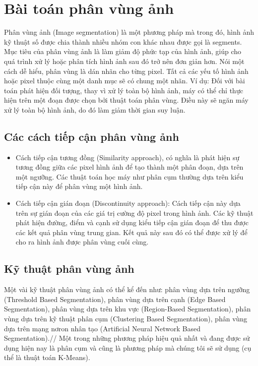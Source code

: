 \documentclass{article}
\begin{document}
    \newpage

    \section{Bài toán phân vùng ảnh}
    \label{sec:img_segmentation}
    Phân vùng ảnh (Image segmentation) là một phương pháp mà trong đó, hình ảnh kỹ thuật số được chia thành nhiều nhóm con khác nhau được gọi là segments. Mục tiêu của phân vùng ảnh là làm giảm độ phức tạp của hình ảnh, giúp cho quá trình xử lý hoặc phân tích hình ảnh sau đó trở nên đơn giản hơn. Nói một cách dễ hiểu, phân vùng là dán nhãn cho từng pixel. Tất cả các yếu tố hình ảnh hoặc pixel thuộc cùng một danh mục sẽ có chung một nhãn. Ví dụ: Đối với bài toán phát hiện đối tượng, thay vì xử lý toàn bộ hình ảnh, máy có thể chỉ thực hiện trên một đoạn được chọn bởi thuật toán phân vùng. Điều này sẽ ngăn máy xử lý toàn bộ hình ảnh, do đó làm giảm thời gian suy luận.
    
    \subsection{Các cách tiếp cận phân vùng ảnh}
    \begin{itemize}
        \item Cách tiếp cận tương đồng (Similarity approach), có nghĩa là phát hiện sự tương đồng giữa các pixel hình ảnh để tạo thành một phân đoạn, dựa trên một ngưỡng. Các thuật toán học máy như phân cụm thường dựa trên kiểu tiếp cận này để phân vùng một hình ảnh.
        \item Cách tiếp cận gián đoạn (Discontinuity approach): Cách tiếp cận này dựa trên sự gián đoạn của các giá trị cường độ pixel trong hình ảnh. Các kỹ thuật phát hiện đường, điểm và cạnh sử dụng kiểu tiếp cận gián đoạn để thu được các kết quả phân vùng trung gian. Kết quả này sau đó có thể được xử lý để cho ra hình ảnh được phân vùng cuối cùng.
    \end{itemize}
    
    \subsection{Kỹ thuật phân vùng ảnh}
    Một vài kỹ thuật phân vùng ảnh có thể kể đến như: phân vùng dựa trên ngưỡng (Threshold Based Segmentation), phân vùng dựa trên cạnh (Edge Based Segmentation), phân vùng dựa trên khu vực (Region-Based Segmentation), phân vùng dựa trên kỹ thuật phân cụm (Clustering Based Segmentation), phân vùng dựa trên mạng nơron nhân tạo (Artificial Neural Network Based Segmentation).//
    Một trong những phương pháp hiệu quả nhất và đang được sử dụng hiện nay là phân cụm và cũng là phương pháp mà chúng tôi sẽ sử dụng (cụ thể là thuật toán K-Means).
\end{document}
